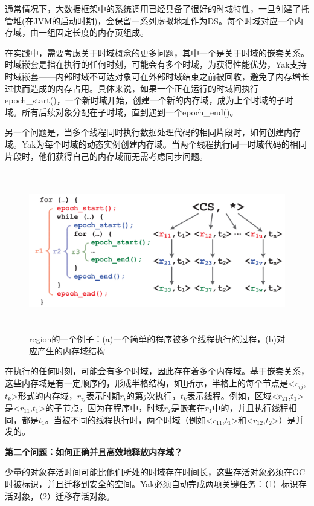 通常情况下，大数据框架中的系统调用已经具备了很好的时域特性，一旦创建了托管堆(在JVM的启动时期)，会保留一系列虚拟地址作为DS。每个时域对应一个内存域，由一组固定长度的内存页组成。

在实践中，需要考虑关于时域概念的更多问题，其中一个是关于时域的嵌套关系。时域嵌套是指在执行的任何时刻，可能会有多个时域，为获得性能优势，Yak支持时域嵌套——内部时域不可达对象可在外部时域结束之前被回收，避免了内存增长过快而造成的内存占用。具体来说，如果一个正在运行的时域间执行epoch\_start()，一个新时域开始，创建一个新的内存域，成为上个时域的子时域。所有后续对象分配在子时域，直到遇到一个epoch\_end()。

另一个问题是，当多个线程同时执行数据处理代码的相同片段时，如何创建内存域。Yak为每个时域的动态实例创建内存域。当两个线程执行同一时域代码的相同片段时，他们获得自己的内存域而无需考虑同步问题。


\begin{figure}[h]
    \centering
    \includegraphics[width=12cm,height=7cm]{figure/epoch.png}
    \caption{
        region的一个例子：(a)一个简单的程序被多个线程执行的过程，(b)对应产生的内存域结构
    }
    \label{img2}
\end{figure}
在执行的任何时刻，可能会有多个时域，因此存在着多个内存域。基于嵌套关系，这些内存域是有一定顺序的，形成半格结构，如\ref {img2}所示，半格上的每个节点是<$r_{ij}$,$t_k$>形式的内存域，$r_{ij}$表示时期$r_i$的第$j$次执行，$t_k$表示线程。例如，区域<$r_{21}$,$t_1$>是<$r_{11}$,$t_1$>的子节点，因为在程序中，时域$r_2$是嵌套在$r_1$中的，并且执行线程相同，都是$t_1$。当被不同的线程执行时，两个时域（例如<$r_{11}$,$t_1$>和<$r_{12}$,$t_2$>）是并发的。

{\bfseries 第二个问题：如何正确并且高效地释放内存域？}

少量的对象存活时间可能比他们所处的时域存在时间长，这些存活对象必须在GC时被标识，并且迁移到安全的空间。Yak必须自动完成两项关键任务：（1）标识存活对象，（2）迁移存活对象。

